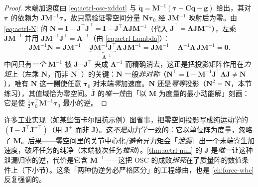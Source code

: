 \begin{proof}
末端加速度由 \cref{eq:actrl-osc-xddot} 与 $\ddot{\mathbf{q}}=\mathbf{M}^{-1}(\boldsymbol{\tau}-\mathbf{C}\dot{\mathbf{q}}-\mathbf{g})$ 给出，其对 $\boldsymbol{\tau}$ 的依赖为 $\mathbf{J}\mathbf{M}^{-1}\boldsymbol{\tau}$。故只需验证零空间分量 $\mathbf{N}\boldsymbol{\tau}_0$ 经 $\mathbf{J}\mathbf{M}^{-1}$ 映射后为零。由 \cref{eq:actrl-N} 的 $\mathbf{N}=\mathbf{I}-\mathbf{J}^\top\bar{\mathbf{J}}^\top=\mathbf{I}-\mathbf{J}^\top\boldsymbol{\Lambda}\mathbf{J}\mathbf{M}^{-1}$（代入 $\bar{\mathbf{J}}^\top=\boldsymbol{\Lambda}\mathbf{J}\mathbf{M}^{-1}$），左乘 $\mathbf{J}\mathbf{M}^{-1}$ 并用 $\mathbf{J}\mathbf{M}^{-1}\mathbf{J}^\top=\boldsymbol{\Lambda}^{-1}$（由 \cref{eq:actrl-Lambda}）：
\[
  \mathbf{J}\mathbf{M}^{-1}\mathbf{N}
  =\mathbf{J}\mathbf{M}^{-1}-\underbrace{\mathbf{J}\mathbf{M}^{-1}\mathbf{J}^\top}_{=\,\boldsymbol{\Lambda}^{-1}}\boldsymbol{\Lambda}\,\mathbf{J}\mathbf{M}^{-1}
  =\mathbf{J}\mathbf{M}^{-1}-\boldsymbol{\Lambda}^{-1}\boldsymbol{\Lambda}\,\mathbf{J}\mathbf{M}^{-1}=\mathbf{0}.
\]
中间只有\emph{一个} $\mathbf{M}^{-1}$ 被 $\mathbf{J}\cdots\mathbf{J}^\top$ 夹成 $\boldsymbol{\Lambda}^{-1}$ 而精确消去，这正是把投影矩阵作用在\emph{力矩}上（左乘 $\mathbf{N}$，而非 $\mathbf{N}^\top$）的关键：$\mathbf{N}$ 一般\emph{非对称}（$\mathbf{N}^\top=\mathbf{I}-\mathbf{M}^{-1}\mathbf{J}^\top\boldsymbol{\Lambda}\mathbf{J}\ne\mathbf{N}$），唯有 $\mathbf{N}$ 这一侧使任意 $\boldsymbol{\tau}_0$ 对末端\emph{零}加速度。$\mathbf{N}$ 还是\emph{幂等}投影（$\mathbf{N}^2=\mathbf{N}$，本节练习），其值域恰为零空间。$\bar{\mathbf{J}}$ 的\emph{唯一性}由「以 $\mathbf{M}$ 为度量的最小动能解」刻画：它是使 $\tfrac12\boldsymbol{\tau}_0^\top\mathbf{M}^{-1}\boldsymbol{\tau}_0$ 最小的逆。
\end{proof}

\begin{insight}
许多工业实现（如某些笛卡尔阻抗示例）图省事，把零空间投影写成纯运动学的 $(\mathbf{I}-\mathbf{J}^\top\mathbf{J}^{+\top})$（用 $\mathbf{J}^+$ 而非 $\bar{\mathbf{J}}$）。这\emph{不是}动力学一致的：它以单位阵为度量，忽略了 $\mathbf{M}$。后果——零空间里的关节中心化/避奇异力矩会「\emph{泄漏}」出一个末端寄生加速度，破坏任务的纯净（末端被次任务\emph{推动}）。\cref{thm:actrl-null} 的 $\bar{\mathbf{J}}$ 是\emph{唯一}让这种泄漏归零的逆，代价是它含 $\mathbf{M}^{-1}$——这把 OSC 的成败\emph{绑死}在了质量阵的数值条件上（下小节）。这条「两种伪逆务必严格区分」的工程缘由，也是 \cref{ch:force-wbc} 反复强调的。
\end{insight}

